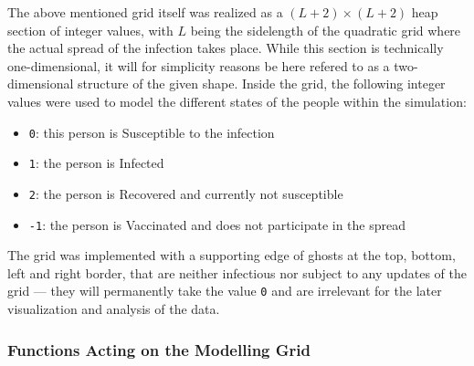 The above mentioned grid itself was realized as a $\left(L+2\right)\times \left(L+2\right)$ heap section of integer values, with $L$ being the sidelength of the quadratic grid where the actual spread of the
infection takes place. While this section is technically one-dimensional, it will for simplicity reasons be here refered to as a two-dimensional structure of the given shape. 
Inside the grid, the following integer values were used to model the different states of the people within the simulation:
\begin{itemize}
    \item \texttt{0}: this person is Susceptible \susceptible{} to the infection
    \item \texttt{1}: the person is Infected \infected{}
    \item \texttt{2}: the person is Recovered \recovered{} and currently not susceptible
    \item \texttt{-1}: the person is Vaccinated \vaccinated{} and does not participate in the spread
\end{itemize}
The grid was implemented with a supporting edge of ghosts at the top, bottom, left and right border, that are neither infectious nor subject to any updates of the grid --- they will permanently take the value
\texttt{0} and are irrelevant for the later visualization and analysis of the data.


\subsubsection{Functions Acting on the Modelling Grid}

